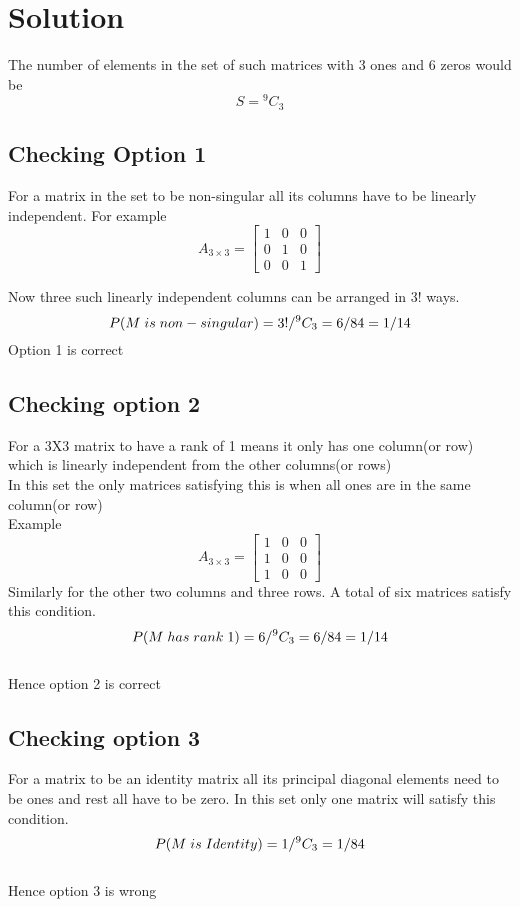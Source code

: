 \documentclass{article}
\begin{document}
\section{Solution}
The number of elements in the set of such matrices with 3 ones and 6 zeros would be 
\begin{equation}
    S = {}^{9}C_{3}
\end{equation}
\subsection{Checking Option 1}
For a matrix in the set to be non-singular all its columns have to be linearly independent. For example
\[
  A_{3\times3} =
  \left[ {\begin{array}{ccc}
    1 & 0 & 0 \\
    0 & 1 & 0 \\
    0 & 0 & 1
  \end{array} } \right]
\]

Now three such linearly independent columns can be arranged in 3! ways.
\[P(M \hspace{0.1cm} is \hspace{0.1cm} non-singular) = 3!/{}^{9}C_{3} = 6/84 = 1/14 \] 
Option 1 is correct

\subsection{Checking option 2}
For a 3X3 matrix to have a rank of 1 means it only has one column(or row) which is linearly independent from the other columns(or rows)\\
In this set the only matrices satisfying this is when all ones are in the same column(or row)\\
Example\\
\[
  A_{3\times3} =
  \left[ {\begin{array}{ccc}
    1 & 0 & 0 \\
    1 & 0 & 0 \\
    1 & 0 & 0
  \end{array} } \right]
\]
Similarly for the other two columns and three rows. A total of six matrices satisfy this condition.
\[P(M \hspace{0.1cm} has\hspace{0.1cm} rank \hspace{0.1cm} 1) = 6/{}^{9}C_{3} = 6/84 = 1/14 \]\\
Hence option 2 is correct

\subsection{Checking option 3}
For a matrix to be an identity matrix all its principal diagonal elements need to be ones and rest all have to be zero.
In this set only one matrix will satisfy this condition. 
\[P(M \hspace{0.1cm} is \hspace{0.1cm}Identity) = 1/{}^{9}C_{3} = 1/84 \]\\
Hence option 3 is wrong
\end{document}
